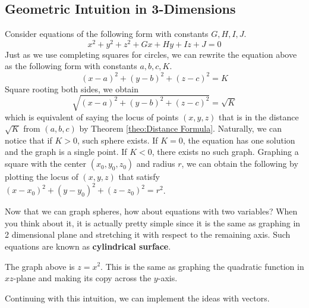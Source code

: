 \documentclass[../../../main.tex]{subfiles}
\begin{document}
\subsection{Geometric Intuition in 3-Dimensions}

Consider equations of the following form with constants $G, H, I, J$.
\[
x^2 + y^2 + z^2 + Gx + Hy + Iz + J = 0
\]
Just as we use completing squares for circles, we can rewrite the
equation above as the following form with constants $a, b, c, K$.
\[
(x - a)^2 + (y - b)^2 + (z - c)^2 = K
\]
Square rooting both sides, we obtain
\[
\sqrt{(x - a)^2 + (y - b)^2 + (z - c)^2}
= \sqrt{K}
\]
which is equivalent of saying the locus of points $(x, y, z)$ that is
in the distance $\sqrt{K}$ from $(a, b, c)$ by Theorem
\ref{theo:Distance Formula}. Naturally, we can notice that if $K > 0$,
such sphere exists. If $K = 0$, the equation has one solution and
the graph is a single point. If $K < 0$, there exists no such graph.
Graphing a square with the center $(x_0, y_0, z_0)$ and radius $r$,
we can obtain the following by plotting the locus of $(x, y, z)$
that satisfy $(x - x_0)^2 + (y - y_0)^2 + (z - z_0)^2 = r^2$.

\begin{figure}[H]
\centering
{}
\end{figure}

Now that we can graph spheres, how about equations with two variables?
When you think about it, it is actually pretty simple since it is the
same as graphing in 2 dimensional plane and stretching it with respect
to the remaining axis. Such equations are known as
\textbf{cylindrical surface}.

\begin{figure}[H]
\centering
{}
\end{figure}

The graph above is $z = x^2$. This is the same as graphing the
quadratic function in $xz$-plane and making its copy across the
$y$-axis.

Continuing with this intuition, we can implement the ideas with
vectors.
\end{document}
